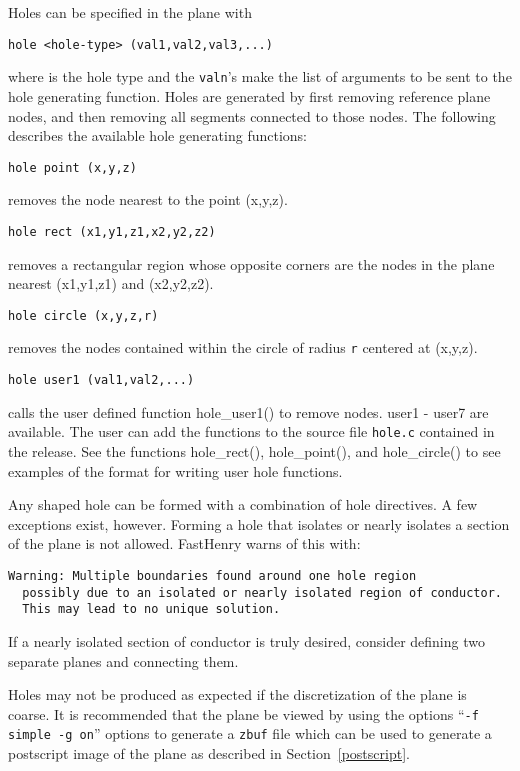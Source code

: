 Holes can be specified in the plane with
\begin{verbatim}
hole <hole-type> (val1,val2,val3,...)
\end{verbatim}
where {\tt <hole-type>} is the hole type and the {\tt valn}'s make the list 
of arguments to be sent to the hole generating function.  Holes are
generated by first removing reference plane nodes, and then removing all 
segments connected to those nodes.
The following describes the available hole generating functions:
\begin{verbatim}
hole point (x,y,z)
\end{verbatim}
removes the node nearest to the point (x,y,z).  
\begin{verbatim}
hole rect (x1,y1,z1,x2,y2,z2)
\end{verbatim}
removes a rectangular region whose opposite corners are the
nodes in the plane nearest (x1,y1,z1) and (x2,y2,z2).
\begin{verbatim}
hole circle (x,y,z,r)
\end{verbatim}
removes the nodes contained within the circle of radius {\tt r}
centered at (x,y,z).
\begin{verbatim}
hole user1 (val1,val2,...)
\end{verbatim}
calls the user defined function hole\_user1() to remove nodes.  
user1 - user7 are available.  The user can add the functions to the
source file {\tt hole.c} contained in the release.  See the functions
hole\_rect(), hole\_point(), and hole\_circle() to see examples of the
format for
writing user hole functions.

Any shaped hole can be formed with a combination of hole directives.
A few exceptions exist, however.  Forming a hole that isolates or
nearly isolates a
section of the plane is not allowed.  FastHenry warns of this with:
\begin{verbatim}
Warning: Multiple boundaries found around one hole region
  possibly due to an isolated or nearly isolated region of conductor.
  This may lead to no unique solution.
\end{verbatim}

\noindent If a nearly isolated section of conductor is truly desired, consider
defining two separate planes and connecting them.

Holes may not be produced as expected if the discretization of the
plane is coarse.  It is recommended that the plane be viewed by using
the options ``{\tt -f simple -g on}'' options to generate a {\tt zbuf}
file which can be used to generate a postscript image of the plane as
described in Section~\ref{postscript}.

